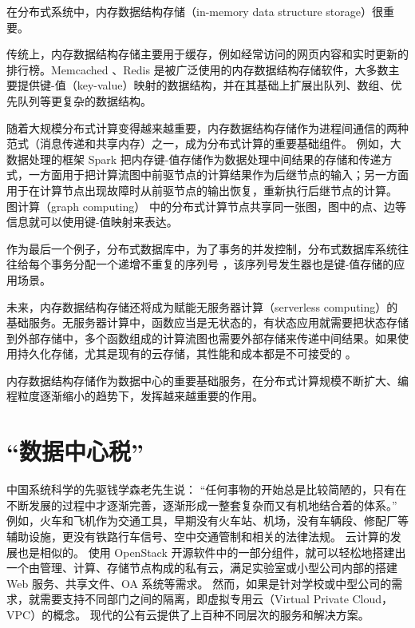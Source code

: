 在分布式系统中，内存数据结构存储（in-memory data structure storage）很重要。

传统上，内存数据结构存储主要用于缓存，例如经常访问的网页内容和实时更新的排行榜。Memcached \cite{memcached}、Redis \cite{redis} 是被广泛使用的内存数据结构存储软件，大多数主要提供键-值（key-value）映射的数据结构，并在其基础上扩展出队列、数组、优先队列等更复杂的数据结构。

随着大规模分布式计算变得越来越重要，内存数据结构存储作为进程间通信的两种范式（消息传递和共享内存）之一，成为分布式计算的重要基础组件。
例如，大数据处理的框架 Spark 把内存键-值存储作为数据处理中间结果的存储和传递方式，一方面用于把计算流图中前驱节点的计算结果作为后继节点的输入；另一方面用于在计算节点出现故障时从前驱节点的输出恢复，重新执行后继节点的计算。
图计算（graph computing）\cite{wu2015g,xiao17tux2} 中的分布式计算节点共享同一张图，图中的点、边等信息就可以使用键-值映射来表达。


作为最后一个例子，分布式数据库中，为了事务的并发控制，分布式数据库系统往往给每个事务分配一个递增不重复的序列号 \cite{li2017eris}，该序列号发生器也是键-值存储的应用场景。

未来，内存数据结构存储还将成为赋能无服务器计算（serverless computing）的基础服务。无服务器计算中，函数应当是无状态的，有状态应用就需要把状态存储到外部存储中，多个函数组成的计算流图也需要外部存储来传递中间结果。如果使用持久化存储，尤其是现有的云存储，其性能和成本都是不可接受的 \cite{jonas2019cloud}。


内存数据结构存储作为数据中心的重要基础服务，在分布式计算规模不断扩大、编程粒度逐渐缩小的趋势下，发挥越来越重要的作用。
\fi


\section{``数据中心税''}
\label{background:sec:datacenter-tax}

\iffalse
中国系统科学的先驱钱学森老先生说： ``任何事物的开始总是比较简陋的，只有在不断发展的过程中才逐渐完善，逐渐形成一整套复杂而又有机地结合着的体系。'' \cite{qianxuesen}
例如，火车和飞机作为交通工具，早期没有火车站、机场，没有车辆段、修配厂等辅助设施，更没有铁路行车信号、空中交通管制和相关的法律法规。
云计算的发展也是相似的。
使用 OpenStack \cite{sefraoui2012openstack} 开源软件中的一部分组件，就可以轻松地搭建出一个由管理、计算、存储节点构成的私有云，满足实验室或小型公司内部的搭建 Web 服务、共享文件、OA 系统等需求。
然而，如果是针对学校或中型公司的需求，就需要支持不同部门之间的隔离，即虚拟专用云（Virtual Private Cloud，VPC）的概念。
现代的公有云提供了上百种不同层次的服务和解决方案。


